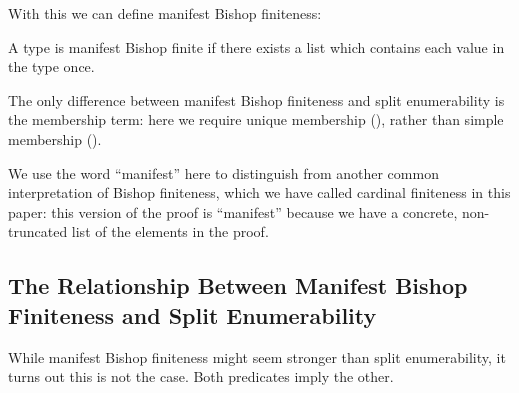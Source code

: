 

With this we can define manifest Bishop finiteness:
\begin{definition}  \label{bish-def}
  A type is manifest Bishop finite if there exists a list which contains each
  value in the type once.
  \begin{agdalisting}
  \end{agdalisting}
  The only difference between manifest Bishop finiteness and split enumerability
  is the membership term: here we require unique membership
  (\AgdaFunction{\ensuremath{\in!}}), rather than simple membership
  (\AgdaFunction{\(\in\)}).
\end{definition}

We use the word ``manifest'' here to distinguish from another common
interpretation of Bishop finiteness, which we have called cardinal finiteness in
this paper: this version of the proof is ``manifest'' because we have a
concrete, non-truncated list of the elements in the proof.

\subsection{The Relationship Between Manifest Bishop Finiteness and Split
  Enumerability}
While manifest Bishop finiteness might seem stronger than split enumerability,
it turns out this is not the case.
Both predicates imply the other.

